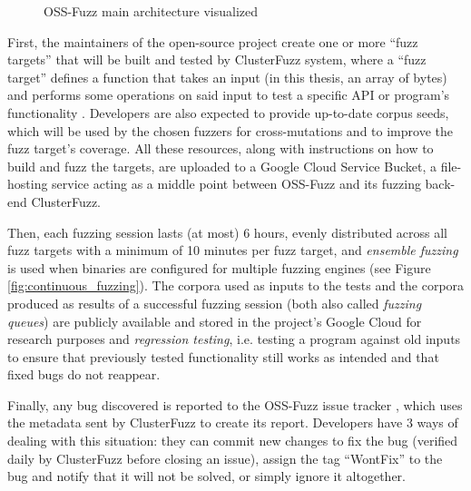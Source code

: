 \begin{figure}[h]
\caption{OSS-Fuzz main architecture visualized \cite{ossfuzz_docs}}
\label{fig:ossfuzz_architecture}
\end{figure}

First, the maintainers of the open-source project create one or more ``fuzz targets'' that will be built and tested by ClusterFuzz system, where a ``fuzz target'' defines a function that takes an input (in this thesis, an array of bytes) and performs some operations on said input to test a specific API or program's functionality \cite{libfuzzer_docs}. Developers are also expected to provide up-to-date corpus seeds, which will be used by the chosen fuzzers for cross-mutations and to improve the fuzz target’s coverage. All these resources, along with instructions on how to build and fuzz the targets, are uploaded to a Google Cloud Service Bucket, a file-hosting service acting as a middle point between OSS-Fuzz and its fuzzing back-end ClusterFuzz.

Then, each fuzzing session lasts (at most) 6 hours, evenly distributed across all fuzz targets with a minimum of 10 minutes per fuzz target, and \textit{ensemble fuzzing} is used when binaries are configured for multiple fuzzing engines (see Figure \ref{fig:continuous_fuzzing}). The corpora used as inputs to the tests and the corpora produced as results of a successful fuzzing session (both also called \textit{fuzzing queues}) are publicly available and stored in the project's Google Cloud for research purposes and \textit{regression testing}, i.e. testing a program against old inputs to ensure that previously tested functionality still works as intended and that fixed bugs do not reappear.

Finally, any bug discovered is reported to the OSS-Fuzz issue tracker \cite{ossfuzz_bugtracker}, which uses the metadata sent by ClusterFuzz to create its report. Developers have 3 ways of dealing with this situation: they can commit new changes to fix the bug (verified daily by ClusterFuzz before closing an issue), assign the tag ``WontFix'' to the bug and notify that it will not be solved, or simply ignore it altogether. 



